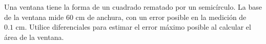 \item Una ventana tiene la forma de un cuadrado rematado por un semicírculo. La base de la ventana mide $60 \text{ cm}$ de anchura, con un error posible en la medición de $0.1 \text{ cm}$. Utilice diferenciales para estimar el error máximo posible al calcular el área de la ventana.
